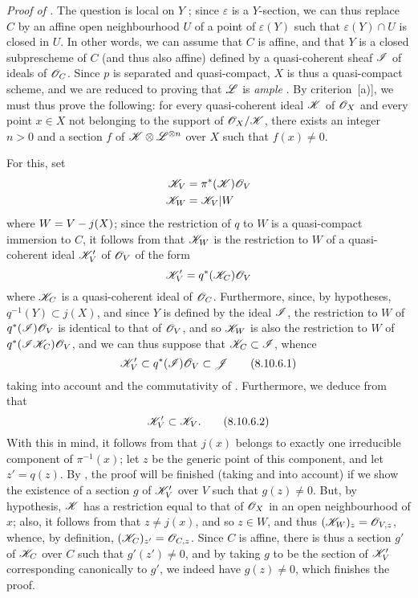 \begin{env}[8.10.6]
\label{II.8.10.6}
\emph{Proof of .}
The question is local on $Y$ ;
since $\varepsilon$ is a $Y$-section, we can thus replace $C$ by an affine open neighbourhood $U$ of a point of $\varepsilon(Y)$ such that $\varepsilon(Y)\cap U$ is closed in $U$.
In other words, we can assume that $C$ is affine, and that $Y$ is a closed subprescheme of $C$ (and thus also affine) defined by a quasi-coherent sheaf
$\mathscr{I}$ of ideals of $\mathscr{O}_C$.
Since $p$ is separated and quasi-compact, $X$ is thus a quasi-compact scheme, and we are reduced to proving that $\mathscr{L}$ is \emph{ample} .
By criterion~[a)], we must thus prove the following:
for every quasi-coherent ideal $\mathscr{K}$ of $\mathscr{O}_X$ and every point $x\in X$ not belonging to the support of $\mathscr{O}_X/\mathscr{K}$, there exists an integer $n>0$ and a section $f$ of $\mathscr{K}\otimes\mathscr{L}^{\otimes n}$ over $X$ such that $f(x)\neq0$.

For this, set
\begin{align*}
  \mathscr{K}_V &= \pi^*(\mathscr{K})\mathscr{O}_V\\
  \mathscr{K}_W &= \mathscr{K}_V|W
\end{align*}
where $W=V- j(X)$;
since the restriction of $q$ to $W$ is a quasi-compact immersion to $C$, it follows from  that $\mathscr{K}_W$ is the restriction to $W$ of a quasi-coherent ideal $\mathscr{K}'_V$ of $\mathscr{O}_V$ of the form
\[
    \mathscr{K}'_V = q^*(\mathscr{K}_C)\mathscr{O}_V
\]
where $\mathscr{K}_C$ is a quasi-coherent ideal of $\mathscr{O}_C$.
Furthermore, since, by hypotheses, $q^{-1}(Y)\subset j(X)$, and since $Y$ is defined by the ideal $\mathscr{I}$, the restriction to $W$ of $q^*(\mathscr{I})\mathscr{O}_V$ is identical to that of $\mathscr{O}_V$, and so $\mathscr{K}_W$ is also the restriction to $W$ of $q^*(\mathscr{I}\mathscr{K}_C)\mathscr{O}_V$, and we can thus suppose that $\mathscr{K}_C\subset\mathscr{I}$, whence
\[
\label{II.8.10.6.1}
    \mathscr{K}'_V \subset q^*(\mathscr{I})\mathscr{O}_V \subset \mathscr{J}
\tag{8.10.6.1}
\]
taking into account  and the commutativity of .
Furthermore, we deduce from  that
\[
\label{II.8.10.6.2}
    \mathscr{K}'_V \subset \mathscr{K}_V.
\tag{8.10.6.2}
\]
With this in mind, it follows from  that $j(x)$ belongs to exactly one irreducible component of $\pi^{-1}(x)$;
let $z$ be the generic point of this component, and let $z'=q(z)$.
By , the proof will be finished (taking  and  into account) if we show the existence of a section $g$ of $\mathscr{K}'_V$ over $V$ such that $g(z)\neq0$.
But, by hypothesis, $\mathscr{K}$ has a restriction equal to that of $\mathscr{O}_X$ in an open neighbourhood of $x$;
also, it follows from  that $z\neq j(x)$, and so $z\in W$, and thus $(\mathscr{K}_W)_z=\mathscr{O}_{V,z}$, whence, by definition, $(\mathscr{K}_C)_{z'}=\mathscr{O}_{C,z}$.
Since $C$ is affine, there is thus a section $g'$ of $\mathscr{K}_C$ over $C$ such that $g'(z')\neq0$, and by taking $g$ to be the section of $\mathscr{K}'_V$ corresponding canonically to $g'$, we indeed have $g(z)\neq0$, which finishes the proof.
\end{env}

